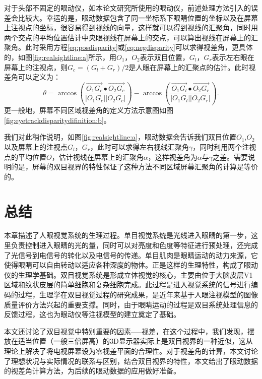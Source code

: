 对于头部不固定的眼动仪，如本论文研究所使用的眼动仪，前述处理方法引入的误差会比较大。幸运的是，眼动数据包含了同一坐标系下眼睛位置的坐标以及在屏幕上注视点的坐标，很容易得到视线的向量，这样就可以得到视线的汇聚角，同时用两个交点的平均位置估计中央眼视线在屏幕上的交点，可以算出视线在屏幕上的汇聚角。此时采用方程\ref{eq:posdisparity}或\ref{eq:negdisparity}可以求得视差角，更具体的，如图\ref{fig:realsightline:a}所示，用$O_1$，$O_2$表示双目位置，$G_l$，$G_r$表示左右眼在屏幕上的注视点，则$G_c=(G_l+G_r)/2$是人眼在屏幕上的汇聚点的估计。此时视差角可以定义为：
\begin{equation}
\label{eq:disparityofeyetrackdata}
\theta = \arccos(\frac{{\overrightarrow {{O_1}{G_c}}  \bullet \overrightarrow {{O_2}{G_c}} }}{{\left| {{O_1}{G_c}}
 \right|\left| {{O_2}{G_c}} \right|}}) - \arccos (\frac{{\overrightarrow {{O_1}{G_l}}
  \bullet \overrightarrow {{O_2}{G_r}} }}{{\left| {{O_1}{G_l}} \right|\left| {{O_2}{G_r}}
  \right|}}).
\end{equation}
更一般地，屏幕不同区域视差角的定义方法示意图如图\ref{fig:eyetrackdisparitydifinition:b}。
\begin{figure}
  \centering
  \hspace{1in}
\end{figure}

我们对此稍作说明，如图\ref{fig:realsightline:a}，眼动数据会告诉我们双目位置${O_1}$,${O_2}$ 以及屏幕上的注视点$G_l$，$G_r$，此时可以求得左右视线汇聚角$\gamma$，同时利用两个注视点的平均位置$O$，估计视线在屏幕上的汇聚角$\alpha$，这样视差角为$\alpha$与$\gamma$之差。需要说明的是，屏幕的双目视界的特性保证了这种方法不同区域屏幕汇聚角的计算是等价的。

\section{总结}
\label{sec:conclusionchapter2}
本章描述了人眼视觉系统的生理过程。单目视觉系统是光线进入眼睛的第一步，这里负责控制进入眼睛的光的量，同时可以对亮度和色度等特征进行预处理，还完成了光信号到电信号的转化以及电信号的传递。单目肌肉是眼睛运动的动力来源，它使得眼睛可以自由转动以适应各种深度的物体。正是这样的生理特性，构成了眼动仪的生理学基础。双目视觉系统是形成立体视觉的核心，主要由位于大脑皮层V1区域和纹状皮层的简单细胞和复杂细胞完成。此过程是进入视觉系统的信号进行编码的过程，生理学在双目视觉过程的研究成果，是近年来基于人眼注视模型的图像质量评价方法兴起的重要支撑。同时，由于眼睛运动的过程是双目系统处理信息的反馈过程，这也为眼动仪等注视模型的建立奠定了基础。

本文还讨论了双目视觉中特别重要的因素-----视差，在这个过程中，我们发现，摆放在适当位置（一般三倍屏高）的3D显示器实际上是双目视界的一种近似，这从理论上解决了将电视屏幕设为零视差平面的合理性。对于视差角的计算，本文讨论了理想状况与实际情况的联系与区别，结合双目视界的特性，本文给出了眼动数据的视差角计算方法，为后续的眼动数据的应用做好准备。
